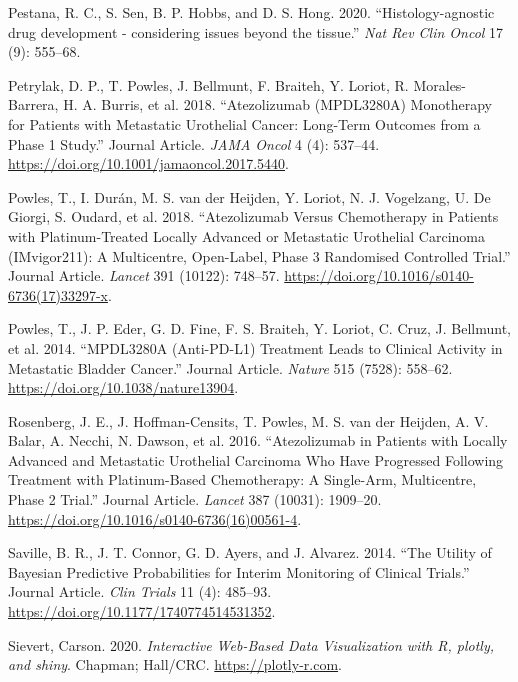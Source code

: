 \begin{CSLReferences}{1}{0}
\leavevmode{}%
Pestana, R. C., S. Sen, B. P. Hobbs, and D. S. Hong. 2020. {``{{H}istology-agnostic drug development - considering issues beyond the tissue}.''} \emph{Nat Rev Clin Oncol} 17 (9): 555--68.

\leavevmode{}%
Petrylak, D. P., T. Powles, J. Bellmunt, F. Braiteh, Y. Loriot, R. Morales-Barrera, H. A. Burris, et al. 2018. {``Atezolizumab (MPDL3280A) Monotherapy for Patients with Metastatic Urothelial Cancer: Long-Term Outcomes from a Phase 1 Study.''} Journal Article. \emph{JAMA Oncol} 4 (4): 537--44. \url{https://doi.org/10.1001/jamaoncol.2017.5440}.

\leavevmode{}%
Powles, T., I. Durán, M. S. van der Heijden, Y. Loriot, N. J. Vogelzang, U. De Giorgi, S. Oudard, et al. 2018. {``Atezolizumab Versus Chemotherapy in Patients with Platinum-Treated Locally Advanced or Metastatic Urothelial Carcinoma (IMvigor211): A Multicentre, Open-Label, Phase 3 Randomised Controlled Trial.''} Journal Article. \emph{Lancet} 391 (10122): 748--57. \url{https://doi.org/10.1016/s0140-6736(17)33297-x}.

\leavevmode{}%
Powles, T., J. P. Eder, G. D. Fine, F. S. Braiteh, Y. Loriot, C. Cruz, J. Bellmunt, et al. 2014. {``MPDL3280A (Anti-PD-L1) Treatment Leads to Clinical Activity in Metastatic Bladder Cancer.''} Journal Article. \emph{Nature} 515 (7528): 558--62. \url{https://doi.org/10.1038/nature13904}.

\leavevmode{}%
Rosenberg, J. E., J. Hoffman-Censits, T. Powles, M. S. van der Heijden, A. V. Balar, A. Necchi, N. Dawson, et al. 2016. {``Atezolizumab in Patients with Locally Advanced and Metastatic Urothelial Carcinoma Who Have Progressed Following Treatment with Platinum-Based Chemotherapy: A Single-Arm, Multicentre, Phase 2 Trial.''} Journal Article. \emph{Lancet} 387 (10031): 1909--20. \url{https://doi.org/10.1016/s0140-6736(16)00561-4}.

\leavevmode{}%
Saville, B. R., J. T. Connor, G. D. Ayers, and J. Alvarez. 2014. {``The Utility of Bayesian Predictive Probabilities for Interim Monitoring of Clinical Trials.''} Journal Article. \emph{Clin Trials} 11 (4): 485--93. \url{https://doi.org/10.1177/1740774514531352}.

\leavevmode{}%
Sievert, Carson. 2020. \emph{Interactive Web-Based Data Visualization with {R}, {plotly}, and {shiny}}. Chapman; Hall/CRC. \url{https://plotly-r.com}.


\end{CSLReferences}
